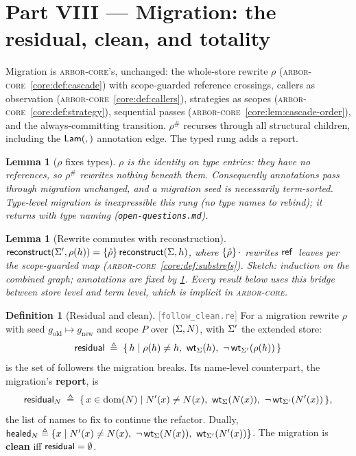 \documentclass[11pt]{article}
\theoremstyle{definition}
\newtheorem{definition}{Definition}[section]
\theoremstyle{plain}
\newtheorem{lemma}[theorem]{Lemma}
\theoremstyle{remark}
\newcommand{\src}[1]{{\footnotesize\textcolor{gray}{[\texttt{#1}]}}}
\newcommand{\arborcore}{\textsc{arbor-core}}
\newcommand{\coreref}[1]{\arborcore~\cref{core:#1}}
\begin{document}
\section{Part VIII --- Migration: the residual, clean, and totality}\label{sec:migration}

Migration is \arborcore{}'s, unchanged: the whole-store rewrite $\rho$
(\coreref{def:cascade}) with scope-guarded reference crossings, callers as observation
(\coreref{def:callers}), strategies as scopes (\coreref{def:strategy}), sequential passes
(\coreref{lem:cascade-order}), and the always-committing transition. $\rho^{\#}$ recurses
through all structural children, including the $\mathsf{Lam}(,)$ annotation edge. The typed rung
adds a report.

\begin{lemma}[$\rho$ fixes types]\label{lem:rho-ty}
$\rho$ is the identity on type entries: they have no references, so $\rho^{\#}$ rewrites
nothing beneath them. Consequently annotations pass through migration unchanged, and a
migration seed is necessarily term-sorted. Type-level migration is inexpressible this rung
(no type names to rebind); it returns with type naming
(\texttt{open-questions.md}).
\end{lemma}

\begin{lemma}[Rewrite commutes with reconstruction]\label{lem:rho-reconstruct}
$\mathsf{reconstruct}(\Sigma', \rho(h)) = \{\hat\rho\}\,\mathsf{reconstruct}(\Sigma,h)$, where
$\{\hat\rho\}\,\cdot$ rewrites $\mathsf{ref}\,$ leaves per the scope-guarded map
(\coreref{def:substrefs}). \emph{Sketch:} induction on the combined graph; annotations are
fixed by \cref{lem:rho-ty}. Every result below uses this bridge between store level and term
level, which is implicit in \arborcore{}.
\end{lemma}

\begin{definition}[Residual and clean]\label{def:residual}
\src{follow\_clean.re} For a migration rewrite $\rho$ with seed
$g_{\mathrm{old}} \mapsto g_{\mathrm{new}}$ and scope $P$ over $(\Sigma, N)$, with
$\Sigma'$ the extended store:
\[
  \residual \;\defeq\; \{\, h \mid \rho(h) \neq h,\ \wtin{\Store}{h},\
    \lnot\,\wtin{\Store'}{\rho(h)} \,\}
\]
is the set of followers the migration breaks. Its name-level counterpart, the migration's
\textbf{report}, is
\[
  \mathsf{residual}_{N} \;\triangleq\; \{\, x \in \operatorname{dom}(N) \mid
    N'(x) \neq N(x),\ \mathsf{wt}_{\Sigma}(N(x)),\
    \lnot\,\mathsf{wt}_{\Sigma'}(N'(x)) \,\},
\]
the list of names to fix to continue the refactor. Dually,
$\mathsf{healed}_{N} \triangleq \{x \mid N'(x) \neq N(x),\
\lnot\,\mathsf{wt}_{\Sigma}(N(x)),\ \mathsf{wt}_{\Sigma'}(N'(x))\}$. The migration is
\textbf{clean} iff $\mathsf{residual} = \emptyset$.
\end{definition}
\end{document}
